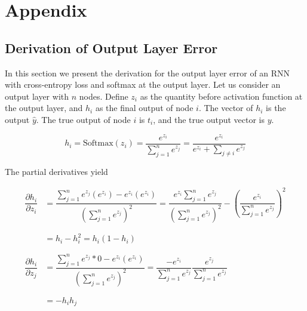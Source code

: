 \documentclass[pageno]{final_paper}
\begin{document}
\newpage
{}


\newpage

\section{Appendix}
\label{Appendix}

\subsection{Derivation of Output Layer Error}
\label{Derivation of Output Layer Error}

In this section we present the derivation for the output layer error of an RNN
with cross-entropy loss and softmax at the output layer. Let us consider an
output layer with $n$ nodes. Define $z_i$ as the quantity before activation
function at the output layer, and $h_i$ as the final output of node $i$. The
vector of $h_i$ is the output $\hat{y}$. The true output of node $i$ is $t_i$,
and the true output vector is $y$.

\begin{equation}
    \label{eq: output layer value}
    h_i = \text{Softmax}(z_i) = \dfrac{e^{z_i}}{\sum\limits_{j=1}^n e^{z_j}} = \dfrac{e^{z_i}}
    {e^{z_i} + \sum\limits_{j\neq i} e^{z_j}}
\end{equation}

The partial derivatives yield

\begin{equation}
    \label{eq: output partials}
    \begin{aligned}
        \dfrac{\partial h_i}{\partial z_i} &= \dfrac{\sum\limits_{j=1}^n e^{z_j}(e^{z_i}) - e^{z_i}(e^{z_i})}
        {\left( \sum\limits_{j=1}^n e^{z_j} \right)^2}
        = \dfrac{e^{z_i}\sum\limits_{j=1}^n e^{z_j}}{\left( \sum\limits_{j=1}^n e^{z_j} \right)^2}
        - \left( \dfrac{e^{z_i}}{ \sum\limits_{j=1}^n e^{z_j} } \right)^2 \\
        &\phantom{=} \\
        &= h_i - h_i^2
        = h_i\left( 1 - h_i \right) \\
        &\phantom{=} \\
        \dfrac{\partial h_i}{\partial z_j} &= \dfrac{\sum\limits_{j=1}^n e^{z_j}*0 - e^{z_i}(e^{z_i})}
        {\left( \sum\limits_{j=1}^n e^{z_j} \right)^2}
        = \dfrac{-e^{z_i}}{\sum\limits_{j=1}^n e^{z_j}}\dfrac{e^{z_j}}{\sum\limits_{j=1}^n e^{z_j}} \\
        &\phantom{=} \\
        &= -h_ih_j
    \end{aligned}
\end{equation}
\end{document}
